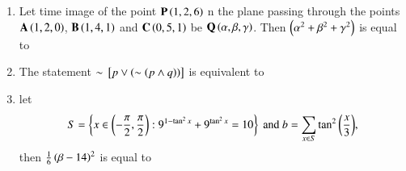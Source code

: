 \documentclass[journal]{IEEEtran}
\numberwithin{equation}{enumi}
\numberwithin{figure}{enumi}
\begin{document}
\begin{enumerate}
    \item 
    Let time image of the point $\mathbf{P}\left(1, 2, 6\right)$ n the plane passing through the points $\mathbf{A}\left(1, 2, 0\right)$, $\mathbf{B}\left(1, 4, 1\right)$ and $\mathbf{C}\left(0, 5, 1\right)$ be $\mathbf{Q}\left(\alpha, \beta, \gamma\right)$. Then $\left(\alpha^2 + \beta^2 + \gamma^2\right)$ is equal to

    \hfill{}

    \begin{enumerate}
    \end{enumerate}

    \item 
    The statement $\sim{}\left[p \lor \left(\sim \left(p \land q\right)\right)\right]$ is equivalent to

    \hfill{}

    \begin{enumerate}
    \end{enumerate}

    \item 
    let 
    \begin{align*}
        S = \left\{x \in \left(-\frac{\pi}{2}, \frac{\pi}{2}\right) : 9^{1-\tan^2 x} + 9^{\tan^2 x} = 10\right\} \text{ and } b = \sum_{x \in S} \tan^2 {\left(\frac{x}{3}\right)},
   \end{align*}
   then $\frac{1}{6}\left(\beta -14\right)^2$ is equal to

    \hfill{}

    \begin{enumerate}
    \end{enumerate}


\end{enumerate}
\end{document}

